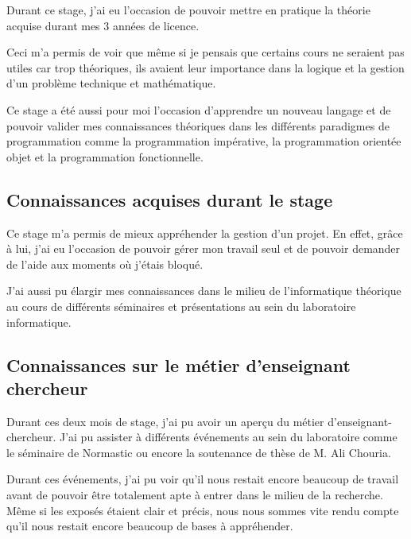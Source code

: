 Durant ce stage, j'ai eu l'occasion de pouvoir mettre en pratique la théorie acquise durant mes 3 années de licence.

Ceci m'a permis de voir que même si je pensais que certains cours ne seraient pas utiles car trop théoriques, ils avaient leur importance dans la logique et la gestion d'un problème technique et mathématique.

Ce stage a été aussi pour moi l'occasion d'apprendre un nouveau langage et de pouvoir valider mes connaissances théoriques dans les différents paradigmes de programmation comme la programmation impérative, la programmation orientée objet et la programmation fonctionnelle.

\subsection{Connaissances acquises durant le stage}    
\label{sub:Connaissances acquises durant le stage}
  
Ce stage m'a permis de mieux appréhender la gestion d'un projet. En effet, grâce à lui, j'ai eu l'occasion de pouvoir gérer mon travail seul et de pouvoir demander de l'aide aux moments où j’étais bloqué.

J'ai aussi pu élargir mes connaissances dans le milieu de l'informatique théorique au cours de différents séminaires et présentations au sein du laboratoire informatique.

\subsection{Connaissances sur le m\'etier d'enseignant chercheur} 
\label{sub:Connaissances sur le m\'etier d'enseignant chercheur}

Durant ces deux mois de stage, j'ai pu avoir un aperçu du métier d'enseignant-chercheur. J'ai pu assister à différents événements au sein du laboratoire comme le séminaire de Normastic ou encore la soutenance de thèse de M. Ali Chouria.

Durant ces événements, j'ai pu voir qu'il nous restait encore beaucoup de travail avant de pouvoir être totalement apte à entrer dans le milieu de la recherche. Même si les exposés étaient clair et précis, nous nous sommes vite rendu compte qu'il nous restait encore beaucoup de bases à appréhender.


